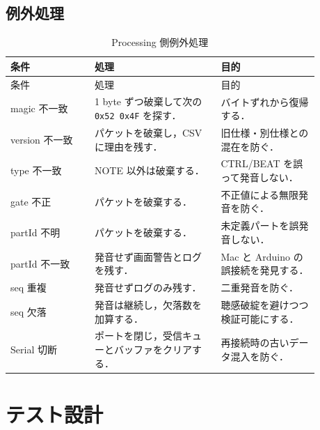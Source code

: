 \documentclass[lualatex,book,openany,paper=a4paper,jafontsize=11.5pt,jafontscale=1.05]{jlreq}
\begin{document}
\section{例外処理}
\begin{longtable}{p{0.24\linewidth}p{0.36\linewidth}p{0.28\linewidth}}
\caption{Processing 側例外処理}\label{tab:exceptions}\\
\toprule
条件 & 処理 & 目的 \\
\midrule
\endfirsthead
\toprule
条件 & 処理 & 目的 \\
\midrule
\endhead
magic 不一致 & 1 byte ずつ破棄して次の \texttt{0x52 0x4F} を探す． & バイトずれから復帰する． \\
version 不一致 & パケットを破棄し，CSV に理由を残す． & 旧仕様・別仕様との混在を防ぐ． \\
type 不一致 & NOTE 以外は破棄する． & CTRL/BEAT を誤って発音しない． \\
gate 不正 & パケットを破棄する． & 不正値による無限発音を防ぐ． \\
partId 不明 & パケットを破棄する． & 未定義パートを誤発音しない． \\
partId 不一致 & 発音せず画面警告とログを残す． & Mac と Arduino の誤接続を発見する． \\
seq 重複 & 発音せずログのみ残す． & 二重発音を防ぐ． \\
seq 欠落 & 発音は継続し，欠落数を加算する． & 聴感破綻を避けつつ検証可能にする． \\
Serial 切断 & ポートを閉じ，受信キューとバッファをクリアする． & 再接続時の古いデータ混入を防ぐ． \\
\bottomrule
\end{longtable}

\chapter{テスト設計}
\end{document}
